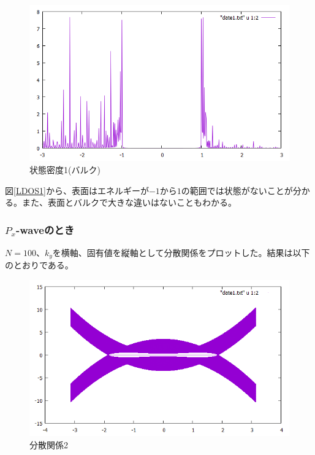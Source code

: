 \documentclass{jsarticle}
\begin{document}
            \begin{figure}[H]
                \centering
                \includegraphics[scale=0.5]{LDOSb_bry.png}
                \caption{状態密度1(バルク)}
                \label{LDOS1b}
            \end{figure}
    
            図\eqref{LDOS1}から、表面はエネルギーが$-1$から$1$の範囲では状態がないことが分かる。また、表面とバルクで大きな違いはないこともわかる。
    
            \subsubsection{$P_x$-waveのとき}
            $N=100$、$k_y$を横軸、固有値を縦軸として分散関係をプロットした。結果は以下のとおりである。
    
            \begin{figure}[H]
                \centering
                \includegraphics[scale=0.5]{BdG2_bry.png}
                \caption{分散関係2}
                \label{Dispersion1}
            \end{figure}
    
\end{document}
